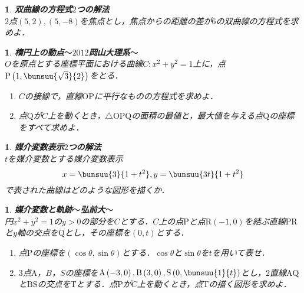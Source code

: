 \documentclass[10pt,
fleqn,
dvipdfmx,
uplatex
]{jsarticle}
\newtheorem{question}[Question]{}
\begin{document}
\begin{question}{\bf\boldmath 双曲線の方程式$2$つの解法}\\
$2$点$\left(5,2\right), \left(5,-8\right)$を焦点とし，焦点からの距離の差が$6$の双曲線の方程式を求めよ．
\end{question}



\begin{question}{\bf\boldmath 楕円上の動点$〜2012$岡山大理系$〜$}\\
$O$を原点とする座標平面における曲線$C:x^2+y^2=1$上に，点$\text{P}\left(1,\bunsuu{{\sqrt 3}}{2}\right)$をとる．
\begin{enumerate}
\item $C$の接線で，直線$\text{OP}$に平行なものの方程式を求めよ．
\item 点$\text{Q}$が$C$上を動くとき，$\triangle \text{OPQ}$の面積の最値と，最大値を与える点$\text{Q}$の座標をすべて求めよ．
\end{enumerate}

\end{question}



\begin{question}{\bf\boldmath 媒介変数表示$2$つの解法}\\
$t$を媒介変数とする媒介変数表示
\[x=\bunsuu{3}{{}1+t^2}, y=\bunsuu{{3t}}{{1+t^2}}\]
で表された曲線はどのような図形を描くか．
\end{question}



\begin{question}{\bf\boldmath 媒介変数と軌跡$〜$弘前大$〜$}\\
円$x^2+y^2=1$の$y>0$の部分を$C$とする．$C$上の点$\text{P}$と点$\text{R}\left(-1,0\right)$を結ぶ直線$\text{PR}$と$y$軸の交点を$\text{Q}$とし，その座標を$\left(0,t\right)$とする．
\begin{enumerate}
\item 点$\text{P}$の座標を$\left(\cos \theta ,\sin \theta \right)$とする．$\cos \theta$と$\sin \theta$を$t$を用いて表せ．
\item $3$点$\text{A}$，$B$，$S$の座標を$\text{A}\left(-3,0\right), \text{B}\left(3,0\right), \text{S}\left(0,\bunsuu{1}{t}\right)$とし，$2$直線$\text{AQ}$と$\text{BS}$の交点を$\text{T}$とする．点$\text{P}$が$C$上を動くとき，点$\text{T}$の描く図形を求めよ．
\end{enumerate}

\end{question}
\end{document}
